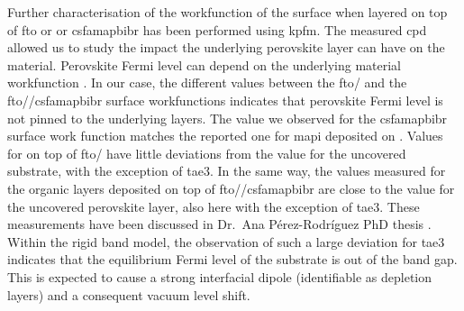 	Further characterisation of the workfunction of the  surface when layered on top of \gls{fto} or  or \gls{csfamapbibr} has been performed using \gls{kpfm}.
	The measured \gls{cpd} allowed us to study the impact the underlying perovskite layer can have on the  material.
	Perovskite Fermi level can depend on the underlying material workfunction \cite{Miller2014,Olthof2017}.
	In our case, the different values between the \gls{fto}\-/ and the \gls{fto}\-/\-/\gls{csfamapbibr} surface workfunctions indicates that perovskite Fermi level is not pinned to the underlying layers.
	The value we observed for the \gls{csfamapbibr} surface work function matches the reported one for \gls{mapi} deposited on  \cite{Miller2014}.
	Values for  on top of \gls{fto}\-/ have little deviations from the value for the uncovered substrate, with the exception of \gls{tae3}.
	In the same way, the values measured for the organic layers deposited on top of \gls{fto}\-/\-/\gls{csfamapbibr} are close to the value for the uncovered perovskite layer, also here with the exception of \gls{tae3}.
	These measurements have been discussed in Dr.\ Ana Pérez\hyp{}Rodríguez PhD thesis \cite{Perez-Rodriguez2018}.
	Within the rigid band model, the observation of such a large deviation for \gls{tae3} indicates that the equilibrium Fermi level of the substrate is out of the  band gap.
	This is expected to cause a strong interfacial dipole (identifiable as depletion layers) and a consequent vacuum level shift.


